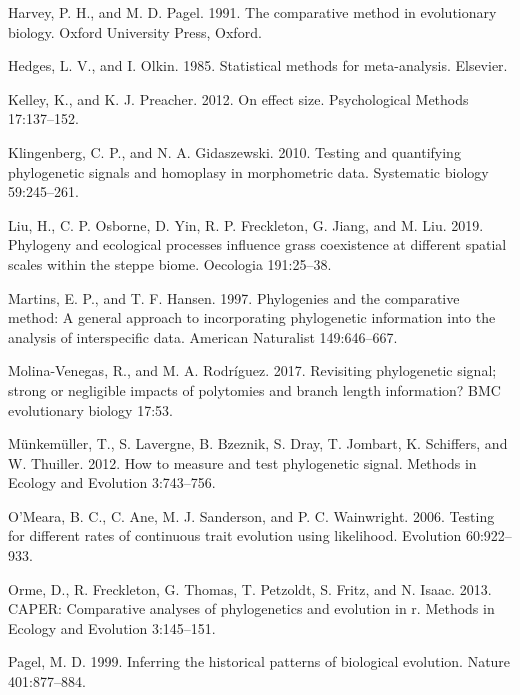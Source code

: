 \documentclass[]{article}
\begin{document}
\leavevmode\hypertarget{ref-HarveyPagel1991}{}%
Harvey, P. H., and M. D. Pagel. 1991. The comparative method in
evolutionary biology. Oxford University Press, Oxford.

\leavevmode\hypertarget{ref-HedgesOlkin1985}{}%
Hedges, L. V., and I. Olkin. 1985. Statistical methods for
meta-analysis. Elsevier.

\leavevmode\hypertarget{ref-Kelley2012}{}%
Kelley, K., and K. J. Preacher. 2012. On effect size. Psychological
Methods 17:137--152.

\leavevmode\hypertarget{ref-Klingenberg2010}{}%
Klingenberg, C. P., and N. A. Gidaszewski. 2010. Testing and quantifying
phylogenetic signals and homoplasy in morphometric data. Systematic
biology 59:245--261.

\leavevmode\hypertarget{ref-Liu2019}{}%
Liu, H., C. P. Osborne, D. Yin, R. P. Freckleton, G. Jiang, and M. Liu.
2019. Phylogeny and ecological processes influence grass coexistence at
different spatial scales within the steppe biome. Oecologia 191:25--38.

\leavevmode\hypertarget{ref-MartinsHansen1997}{}%
Martins, E. P., and T. F. Hansen. 1997. Phylogenies and the comparative
method: A general approach to incorporating phylogenetic information
into the analysis of interspecific data. American Naturalist
149:646--667.

\leavevmode\hypertarget{ref-MolinaVenegas2017}{}%
Molina-Venegas, R., and M. A. Rodríguez. 2017. Revisiting phylogenetic
signal; strong or negligible impacts of polytomies and branch length
information? BMC evolutionary biology 17:53.

\leavevmode\hypertarget{ref-Munkemuller_et_al2012}{}%
Münkemüller, T., S. Lavergne, B. Bzeznik, S. Dray, T. Jombart, K.
Schiffers, and W. Thuiller. 2012. How to measure and test phylogenetic
signal. Methods in Ecology and Evolution 3:743--756.

\leavevmode\hypertarget{ref-OMeara_et_al2006}{}%
O'Meara, B. C., C. Ane, M. J. Sanderson, and P. C. Wainwright. 2006.
Testing for different rates of continuous trait evolution using
likelihood. Evolution 60:922--933.

\leavevmode\hypertarget{ref-Orme2013}{}%
Orme, D., R. Freckleton, G. Thomas, T. Petzoldt, S. Fritz, and N. Isaac.
2013. CAPER: Comparative analyses of phylogenetics and evolution in r.
Methods in Ecology and Evolution 3:145--151.

\leavevmode\hypertarget{ref-Pagel1999}{}%
Pagel, M. D. 1999. Inferring the historical patterns of biological
evolution. Nature 401:877--884.
\end{document}
